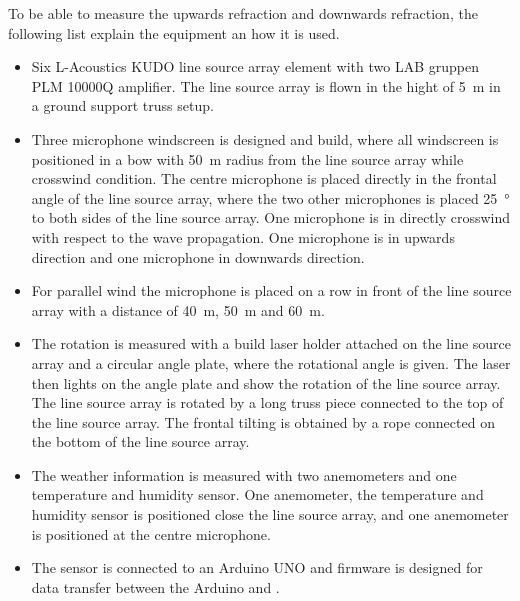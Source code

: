 To be able to measure the upwards refraction and downwards refraction, the following list explain the equipment an how it is used.

\begin{itemize}
\item Six L-Acoustics KUDO line source array element with two LAB gruppen PLM 10000Q amplifier. The line source array is flown in the hight of \SI{5}{\meter} in a ground support truss setup.
\item Three microphone windscreen is designed and build, where all windscreen is positioned in a bow with \SI{50}{\meter} radius from the line source array while crosswind condition. The centre microphone is placed directly in the frontal angle of the line source array, where the two other microphones is placed \SI{25}{\degree} to both sides of the line source array. One microphone is in directly crosswind with respect to the wave propagation. One microphone is in upwards direction and one microphone in downwards direction.
\item For parallel wind the microphone is placed on a row in front of the line source array with a distance of \SI{40}{\meter}, \SI{50}{\meter} and \SI{60}{\meter}.
\item The rotation is measured with a build laser holder attached on the line source array and a circular angle plate, where the rotational angle is given. The laser then lights on the angle plate and show the rotation of the line source array. The line source array is rotated by a long truss piece connected to the top of the line source array. The frontal tilting is obtained by a rope connected on the bottom of the line source array.
\item The weather information is measured with two anemometers and one temperature and humidity sensor. One anemometer, the temperature and humidity sensor is positioned close the line source array, and one anemometer is positioned at the centre microphone. 
\item The sensor is connected to an Arduino UNO and firmware is designed for data transfer between the Arduino and \matlab .
\end{itemize}


